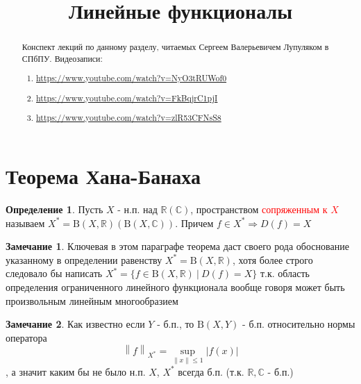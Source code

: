 \documentclass[12pt,a4paper]{article}
\title{Линейные функционалы}
\date{}
\theoremstyle{definition}
\newtheorem{definition}{Определение}[section]
\newtheorem{corollarydf}{Замечание}[definition]
\newcommand{\Real}{\mathbb{R}}
\newcommand{\Cmplx}{\mathbb{C}}
\newcommand{\norm}[1]{\left\lVert#1\right\rVert}
\newcommand{\setbuild}[2]{\{#1\:|\:#2\}}
\newcommand{\bounded}[2]{\textrm{B}(#1, #2)}
\begin{document}
\maketitle

\begin{abstract}
	Конспект лекций по данному разделу, читаемых Сергеем Валерьевичем Лупуляком в СПбПУ. Видеозаписи:
	\begin{enumerate}
		\item \url{https://www.youtube.com/watch?v=NyO3tRUWof0}
		\item \url{https://www.youtube.com/watch?v=FkBqjrC1pjI}
		\item \url{https://www.youtube.com/watch?v=zlR53CFNsS8}
	\end{enumerate}
	
\end{abstract}

\newpage

\section{Теорема Хана-Банаха}

\begin{definition}
	Пусть $X$ - н.п. над $\Real(\Cmplx)$, пространством \textcolor{red}{сопряженным к $X$} называем $X^*=\bounded{X}{\Real}(\bounded{X}{\Cmplx})$. Причем $f\in X^*\Rightarrow D(f)=X$
\end{definition}
\begin{corollarydf}
	Ключевая в этом параграфе теорема даст своего рода обоснование указанному в определении равенству $X^*=\bounded{X}{\Real}$, хотя более строго следовало бы написать $X^*=\setbuild{f\in \bounded{X}{\Real}}{D(f)=X}$ т.к. область определения ограниченного линейного функционала вообще говоря может быть произвольным линейным многообразием
\end{corollarydf}
\begin{corollarydf}
	Как известно если $Y$ - б.п., то $\bounded{X}{Y}$ - б.п. относительно нормы оператора $$\norm{f}_{X^*}=\sup_{\norm{x}\leq1}|f(x)|$$, а значит каким бы не было н.п. $X$, $X^*$ всегда б.п. (т.к. $\Real,\Cmplx$ - б.п.)
\end{corollarydf}
\end{document}
